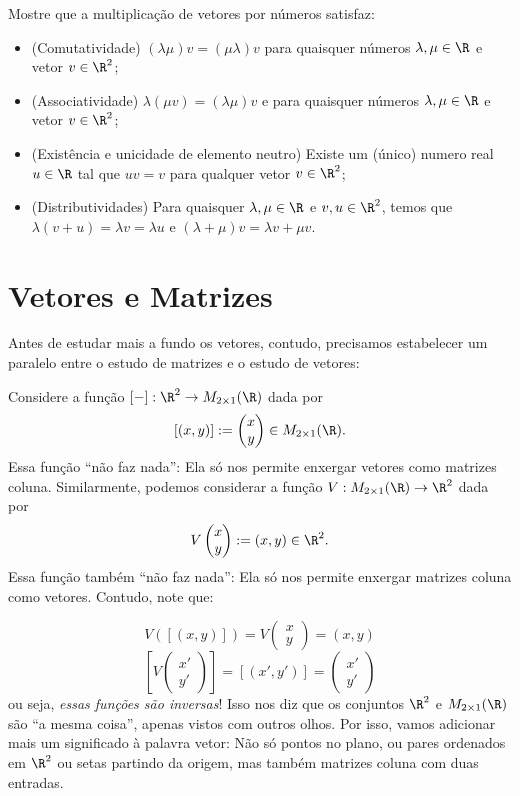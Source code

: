 \begin{exerc}
	Mostre que a multiplicação de vetores por números satisfaz:
	\begin{itemize}
		\item (Comutatividade) $(\lambda\mu)v=(\mu\lambda)v$ para quaisquer números $\lambda,\mu\in \R$ e vetor $v\in \R^2$;
		\item (Associatividade) $\lambda(\mu v)=(\lambda\mu)v$ e para quaisquer números $\lambda,\mu\in \R$ e vetor $v\in \R^2$;
		\item (Existência e unicidade de elemento neutro) Existe um (único) numero real $u\in \R$ tal que $u v=v$ para qualquer vetor $v\in\R^2$;
		\item (Distributividades) Para quaisquer $\lambda,\mu \in \R$ e $v,u\in\R^2$, temos que $\lambda(v+u)=\lambda v=\lambda u$ e $(\lambda+\mu)v=\lambda v+\mu v$.
	\end{itemize}
\end{exerc}

\section{Vetores e Matrizes}

Antes de estudar mais a fundo os vetores, contudo, precisamos estabelecer um paralelo entre o estudo de matrizes e o estudo de vetores:

Considere a função $[-]:\R^2\to M_{2\times 1}(\R)$ dada por
\[[(x,y)]:=\begin{pmatrix}
x\\y
\end{pmatrix}\in M_{2\times 1}(\R).\] Essa função ``não faz nada'': Ela só nos permite enxergar vetores como matrizes coluna. Similarmente, podemos considerar a função $V:M_{2\times 1}(\R)\to \R^2$ dada por 
\[V\begin{pmatrix}
x\\y
\end{pmatrix}:=(x,y)\in \R^2.\] Essa função também ``não faz nada'': Ela só nos permite enxergar matrizes coluna como vetores. Contudo, note que:

\[V([(x,y)])=V\begin{pmatrix}
x\\y
\end{pmatrix}=(x,y)\]
\[\left[V\begin{pmatrix}
x'\\y'
\end{pmatrix}\right]=[(x',y')]=\begin{pmatrix}
x'\\y'
\end{pmatrix}\]ou seja, \textit{essas funções são inversas}! Isso nos diz que os conjuntos $\R^2$ e $M_{2\times 1}(\R)$ são ``a mesma coisa'', apenas vistos com outros olhos. Por isso, vamos adicionar mais um significado à palavra vetor: Não só pontos no plano, ou pares ordenados em $\R^2$ ou setas partindo da origem, mas também matrizes coluna com duas entradas.

